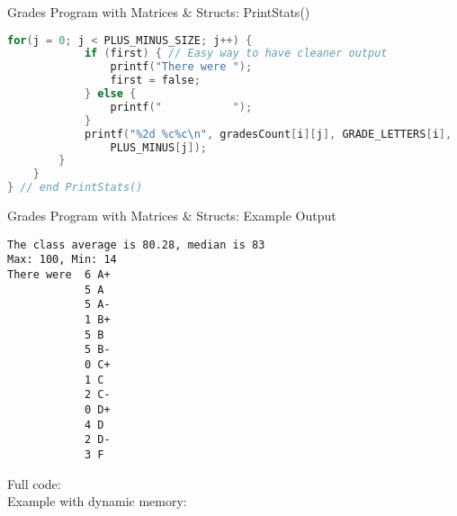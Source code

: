 \documentclass[graphics]{beamer}
\begin{document}
\begin{frame}[fragile]{Grades Program with Matrices \& Structs: PrintStats()}
    \begin{lstlisting}[language=C,basicstyle=\scriptsize,keywordstyle=\color{blue},commentstyle=\color{green},showstringspaces=false,stringstyle=\color{red}]
        for(j = 0; j < PLUS_MINUS_SIZE; j++) {
            if (first) { // Easy way to have cleaner output
                printf("There were ");
                first = false;
            } else {
                printf("           ");
            }
            printf("%2d %c%c\n", gradesCount[i][j], GRADE_LETTERS[i],
                PLUS_MINUS[j]);
        }
    }
} // end PrintStats()
\end{lstlisting}
\end{frame}

\begin{frame}[fragile]{Grades Program with Matrices \& Structs: Example Output}
    \scriptsize
    \begin{verbatim}
The class average is 80.28, median is 83
Max: 100, Min: 14
There were  6 A+
            5 A 
            5 A-
            1 B+
            5 B 
            5 B-
            0 C+
            1 C 
            2 C-
            0 D+
            4 D 
            2 D-
            3 F
    \end{verbatim}
    Full code:  \\
    Example with dynamic memory: 
\end{frame}
\end{document}
